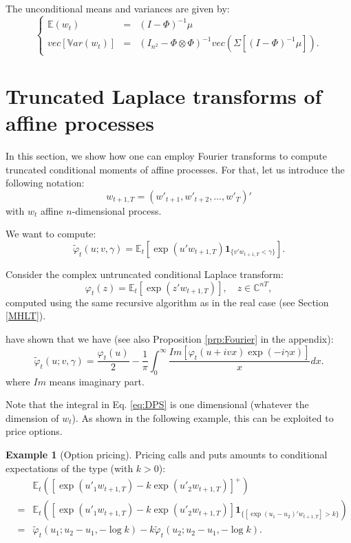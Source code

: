 \documentclass[
  12pt,
]{book}
\theoremstyle{definition}
\theoremstyle{definition}
\newtheorem{example}{Example}[chapter]
\theoremstyle{definition}
\theoremstyle{definition}
\theoremstyle{remark}
\begin{document}
The unconditional means and variances are given by:
\begin{equation}
\left\{
\begin{array}{ccl}
\mathbb{E}(w_t) &=& (I - \Phi)^{-1}\mu\\
vec[\mathbb{V}ar(w_t)] &=& (I_{n^2} - \Phi \otimes \Phi)^{-1} vec\left(\Sigma[(I - \Phi)^{-1}\mu]\right).
\end{array}
\right.\label{eq:uncondmeanvar}
\end{equation}

\hypertarget{TransfAna}{%
\section{Truncated Laplace transforms of affine processes}\label{TransfAna}}

In this section, we show how one can employ Fourier transforms to compute truncated conditional moments of affine processes. For that, let us introduce the following notation:
\[
w_{t+1,T} = (w'_{t+1}, w'_{t+2},\dots, w'_T)'
\]
with \(w_t\) affine \(n\)-dimensional process.

We want to compute:
\[
\tilde{\varphi}_t(u ; v, \gamma) = \mathbb{E}_t[\exp(u'w_{t+1,T})\textbf{1}_{\{v'w_{t+1,T}<\gamma\}}].
\]

Consider the complex untruncated conditional Laplace transform:
\[
\varphi_t(z) = \mathbb{E}_t[\exp(z'w_{t+1,T})],\quad  z \in \mathbb{C}^{nT},
\]
computed using the same recursive algorithm as in the real case (see Section \ref{MHLT}).

\citet{Duffie_Pan_Singleton_2000} have shown that we have (see also Proposition \ref{prp:Fourier} in the appendix):
\begin{equation}
\tilde{\varphi}_t(u ; v, \gamma) =  \frac{\varphi_t(u)}{2} - \frac{1}{\pi}
\int^\infty_0 \frac{Im[\varphi_t(u+ivx) \exp(-i\gamma x)]}{x} dx.\label{eq:DPS}
\end{equation}
where \(Im\) means imaginary part.

Note that the integral in Eq. \eqref{eq:DPS} is one dimensional (whatever the dimension of \(w_t\)). As shown in the following example, this can be exploited to price options.

\begin{example}[Option pricing]
\protect\hypertarget{exm:OptionPricing}{}\label{exm:OptionPricing}Pricing calls and puts amounts to conditional expectations of the type (with \(k > 0\)):
\begin{eqnarray*}
&& \mathbb{E}_t\left([\exp(u'_1 w_{t+1,T})-k   \exp(u'_2 w_{t+1,T})]^+\right) \\
&= &  \mathbb{E}_t\left([\exp(u'_1 w_{t+1,T})-k   \exp(u'_2 w_{t+1,T})]\textbf{1}_{\{[\exp(u_1-u_2)'w_{t+1,T}] > k \}}\right) \\
&= & \tilde{\varphi}_t(u_1 ; u_2-u_1, - \log   k) - k \tilde{\varphi}_t(u_2 ; u_2-u_1, - \log   k).
\end{eqnarray*}
\end{example}
\end{document}
